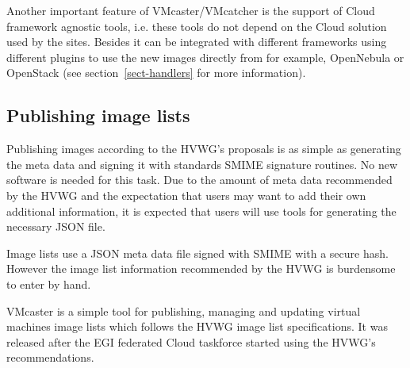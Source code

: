 \documentclass{cai}
\begin{document}
Another important feature of VMcaster/VMcatcher is the support of Cloud framework agnostic tools, i.e. these tools do not depend on the Cloud solution used by the sites. Besides it can be integrated with different frameworks using different plugins to use the new images directly from for example, OpenNebula or OpenStack (see section~\ref{sect-handlers} for more information).



\subsection{Publishing image lists}
Publishing images according to the HVWG's proposals is as simple as generating the meta data and signing it with standards SMIME signature routines. No new software is needed for this task. Due to the amount of meta data recommended by the HVWG and the expectation that users may want to add their own additional information, it is expected that users will use tools for generating the necessary JSON file.

Image lists use a JSON meta data file signed with SMIME  with a secure hash. However the image list information recommended by the HVWG is burdensome to enter by hand.
 
VMcaster is a simple tool for publishing, managing and updating virtual machines image lists which follows the HVWG image list specifications. It was released after the EGI federated Cloud taskforce started using the HVWG's recommendations. 
\end{document}
